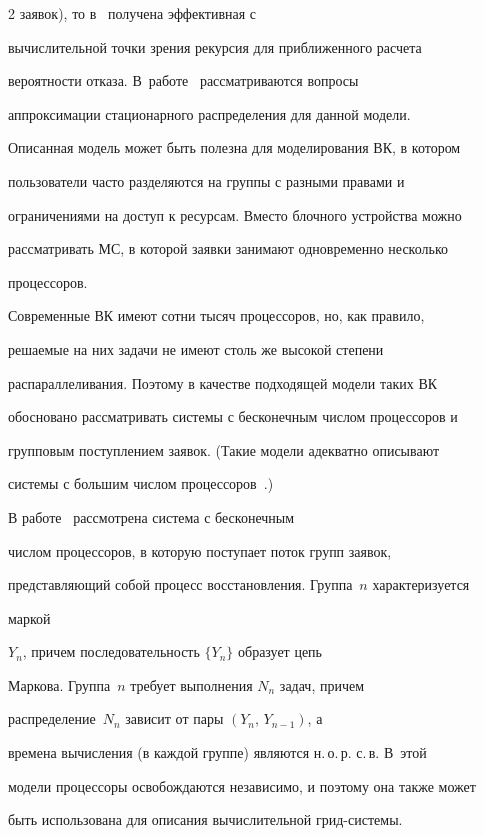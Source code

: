 \begin{multicols}{2}
заявок), то в~\cite{kaufman81} получена эффективная с

вычислительной точки зрения рекурсия для приближенного расчета

вероятности отказа. В~работе~\cite{whitt85} рассматриваются вопросы

аппроксимации стационарного распределения для данной модели.

Описанная модель может быть полезна для моделирования ВК, в котором

пользователи  часто разделяются на группы с разными правами и

ограничениями на доступ к ресурсам. Вместо блочного устройства можно

рассматривать МС, в которой заявки занимают одновременно несколько

процессоров.



Современные ВК имеют сотни тысяч процессоров, но, как правило,

решаемые на них задачи не имеют столь же высокой степени

распараллеливания. Поэтому в качестве подходящей модели таких ВК

обосновано рассматривать системы с бесконечным числом процессоров и

групповым поступлением заявок. (Такие  модели  адекватно описывают

системы  с большим числом процессоров~\cite{Borovkov, Kovalenko}.)



В работе~\cite{liu-templeton} рассмотрена система с бесконечным

чис\-лом процессоров, в которую поступает поток групп заявок,

 представляющий собой процесс восстановления. Группа~$n$ характеризуется  {\it

 маркой}

$Y_{n}$, причем последовательность $\{Y_{n}\}$ образует цепь

Маркова. Группа~$n$ требует выполнения $N_{n}$ задач, причем

распределение~$N_{n}$ зависит  от пары $(Y_{n},\, Y_{n-1})$, а

времена вычисления  (в каждой группе) являются н.\,о.\,р. с.\,в. В~этой

модели процессоры освобождаются независимо, и поэтому она также может

быть использована  для описания вычислительной грид-сис\-те\-мы.


\end{multicols}
